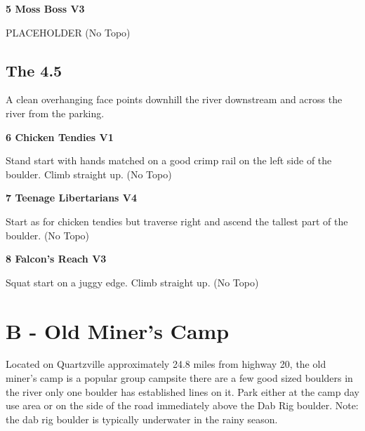 \begin{multicols}{2}
\needspace{1.5cm}
\label{rt:Moss Boss}
\colorbox{green!20}{
\parbox{0.95\linewidth}{
\textbf{
5 Moss Boss V3  
}}}

\begin{adjustwidth}{0.5cm}{}			
PLACEHOLDER (No Topo)
\end{adjustwidth}




\needspace{1.5cm}
\subsection*{The 4.5}\label{bf:The 4.5}
A clean overhanging face points downhill the river downstream and across the river from the parking.\\
	


\needspace{1.5cm}
\label{rt:Chicken Tendies}
\colorbox{green!20}{
\parbox{0.95\linewidth}{
\textbf{
6 Chicken Tendies V1  
}}}

\begin{adjustwidth}{0.5cm}{}			
Stand start with hands matched on a good crimp rail on the left side of the boulder. Climb straight up. (No Topo)
\end{adjustwidth}



\needspace{1.5cm}
\label{rt:Teenage Libertarians}
\colorbox{RoyalBlue!20}{
\parbox{0.95\linewidth}{
\textbf{
7 Teenage Libertarians V4  
}}}

\begin{adjustwidth}{0.5cm}{}			
Start as for chicken tendies but traverse right and ascend the tallest part of the boulder. (No Topo)
\end{adjustwidth}



\needspace{1.5cm}
\label{rt:Falcon's Reach}
\colorbox{green!20}{
\parbox{0.95\linewidth}{
\textbf{
8 Falcon's Reach V3  
}}}

\begin{adjustwidth}{0.5cm}{}			
Squat start on a juggy edge. Climb straight up. (No Topo)
\end{adjustwidth}




\newpage

\section{B - Old Miner's Camp}\label{sa:Old Miner's Camp}
Located on Quartzville approximately 24.8 miles from highway 20, the old miner's camp is a popular group campsite there are a few good sized boulders in the river only one boulder has established lines on it. Park either at the camp day use area or on the side of the road immediately above the Dab Rig boulder. Note: the dab rig boulder is typically underwater in the rainy season.\\





\end{multicols}
